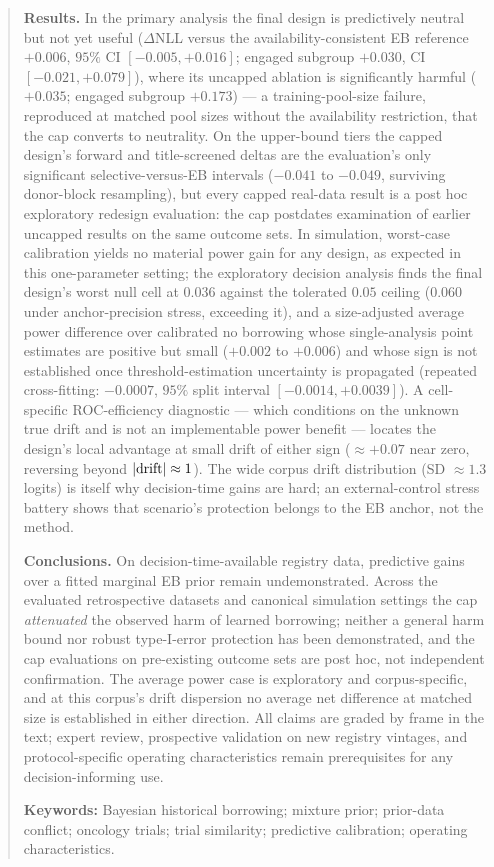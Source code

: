 \documentclass[11pt]{article}
\begin{document}
\begin{abstract}
\noindent\textbf{Results.} In the primary analysis the final design is
predictively neutral but not yet useful ($\Delta$NLL versus the
availability-consistent EB reference $+0.006$, $95\%$ CI
$[-0.005,+0.016]$; engaged subgroup $+0.030$, CI $[-0.021,+0.079]$),
where its uncapped ablation is significantly harmful ($+0.035$; engaged
subgroup $+0.173$) --- a training-pool-size failure, reproduced at
matched pool sizes without the availability restriction, that the cap
converts to neutrality. On the upper-bound tiers the capped design's
forward and title-screened deltas are the evaluation's only significant
selective-versus-EB intervals ($-0.041$ to $-0.049$, surviving
donor-block resampling), but every capped real-data result is a post hoc
exploratory redesign evaluation: the cap postdates examination of earlier
uncapped results on the same outcome sets. In simulation, worst-case
calibration yields no material power gain for any design, as expected in
this one-parameter setting; the exploratory decision analysis finds the
final design's worst null cell at $0.036$ against the tolerated $0.05$
ceiling ($0.060$ under anchor-precision stress, exceeding it), and a
size-adjusted average power difference over calibrated no borrowing whose
single-analysis point estimates are positive but small ($+0.002$ to
$+0.006$) and whose sign is not established once threshold-estimation
uncertainty is propagated (repeated cross-fitting: $-0.0007$, $95\%$
split interval $[-0.0014,+0.0039]$). A cell-specific ROC-efficiency
diagnostic --- which conditions on the unknown true drift and is not an
implementable power benefit --- locates the design's local advantage at
small drift of either sign ($\approx +0.07$ near zero, reversing beyond
$|{\rm drift}| \approx 1$). The wide corpus
drift distribution (SD $\approx 1.3$ logits) is itself why decision-time
gains are hard; an external-control stress battery shows that scenario's
protection belongs to the EB anchor, not the method.

\noindent\textbf{Conclusions.} On decision-time-available registry data,
predictive gains over a fitted marginal EB prior remain undemonstrated.
Across the evaluated retrospective datasets and canonical simulation
settings the cap \emph{attenuated} the observed harm of learned borrowing;
neither a general harm bound nor robust type-I-error protection has been
demonstrated, and the cap evaluations on pre-existing outcome sets are
post hoc, not independent confirmation. The average power case is
exploratory and corpus-specific, and at this corpus's drift dispersion no
average net difference at matched size is established in either
direction. All claims are graded by frame in the text; expert review,
prospective validation on new registry vintages, and protocol-specific
operating characteristics remain prerequisites for any decision-informing
use.

\vspace{0.5em}
\noindent\textbf{Keywords:} Bayesian historical borrowing; mixture prior;
prior-data conflict; oncology trials; trial similarity; predictive
calibration; operating characteristics.
\end{abstract}
\end{document}
